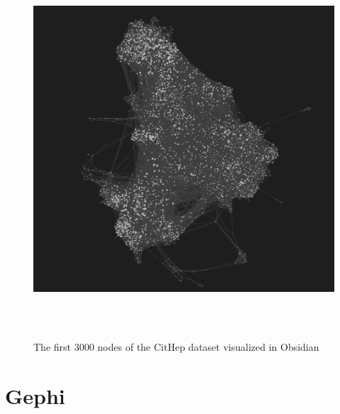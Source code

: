 \begin{figure}[p]\centering
  \includegraphics[width=140mm, height=140mm]{img/Obsidian_3000}
  \caption{The first 3000 nodes of the CitHep dataset visualized in Obsidian}
  \label{obr:obsidian_3000}
\end{figure}

\section{Gephi}




